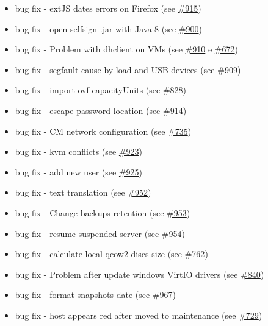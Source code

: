 \begin{itemize}
    \item bug fix - extJS dates errors on Firefox (see \href{https://srcmaster.eurotux.com/pm/p/etva/ticket/915}{\#915})
    \item bug fix - open selfsign .jar with Java 8 (see \href{https://srcmaster.eurotux.com/pm/p/etva/ticket/900}{\#900})
    \item bug fix - Problem with dhclient on VMs (see \href{https://srcmaster.eurotux.com/pm/p/etva/ticket/910}{\#910} e \href{https://srcmaster.eurotux.com/pm/p/etva/ticket/672}{\#672})
    \item bug fix - segfault cause by load and USB devices (see \href{https://srcmaster.eurotux.com/pm/p/etva/ticket/909}{\#909})
    \item bug fix - import ovf capacityUnits (see \href{https://srcmaster.eurotux.com/pm/p/etva/ticket/828}{\#828})
    \item bug fix - escape password location (see \href{https://srcmaster.eurotux.com/pm/p/etva/ticket/914}{\#914})
    \item bug fix - CM network configuration (see \href{https://srcmaster.eurotux.com/pm/p/etva/ticket/735}{\#735})
    \item bug fix - kvm conflicts (see \href{https://srcmaster.eurotux.com/pm/p/etva/ticket/923}{\#923})
    \item bug fix - add new user (see \href{https://srcmaster.eurotux.com/pm/p/etva/ticket/925}{\#925})
    \item bug fix - text translation (see \href{https://srcmaster.eurotux.com/pm/p/etva/ticket/952}{\#952})
    \item bug fix - Change backups retention (see \href{https://srcmaster.eurotux.com/pm/p/etva/ticket/953}{\#953})
    \item bug fix - resume suspended server (see \href{https://srcmaster.eurotux.com/pm/p/etva/ticket/954}{\#954})
    \item bug fix - calculate local qcow2 discs size (see \href{https://srcmaster.eurotux.com/pm/p/etva/ticket/762}{\#762})
    \item bug fix - Problem after update windows VirtIO drivers (see \href{https://srcmaster.eurotux.com/pm/p/etva/ticket/840}{\#840})
    \item bug fix - format snapshots date (see \href{https://srcmaster.eurotux.com/pm/p/etva/ticket/967}{\#967})
    \item bug fix - host appears red after moved to maintenance (see \href{https://srcmaster.eurotux.com/pm/p/etva/ticket/729}{\#729})

\end{itemize}
